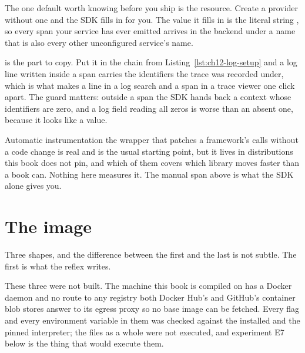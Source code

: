 \noindent
The one default worth knowing before you ship is the resource. Create a
provider without one and the SDK fills in  for you. The
value it fills in is the literal string , so every
span your service has ever emitted arrives in the backend under a name that
is also every other unconfigured service's name.


\noindent
{} is the part to copy. Put it in the chain from
Listing~\ref{lst:ch12-log-setup} and a log line written inside a span
carries the identifiers the trace was recorded under, which is what makes
a line in a log search and a span in a trace viewer one click apart. The
 guard matters: outside a span the SDK hands back a context
whose identifiers are zero, and a log field reading all zeros is worse
than an absent one, because it looks like a value.

\begin{versionbox}
Automatic instrumentation \dash{} the 
wrapper that patches a framework's calls without a code change \dash{} is
real and is the usual starting point, but it lives in distributions this
book does not pin, and which of them covers which library moves faster
than a book can. Nothing here measures it. The manual span above is what
the SDK alone gives you.
\end{versionbox}

\section{The image}
\label{sec:ch12-image}

Three shapes, and the difference between the first and the last is not
subtle. The first is what the reflex writes.




\begin{verifybox}
These three were not built. The machine this book is compiled on has a
Docker daemon and no route to any registry \dash{} both Docker Hub's and
GitHub's container blob stores answer  to its egress proxy
\dash{} so no base image can be fetched. Every flag and every environment
variable in them was checked against the installed  and the
pinned interpreter; the files as a whole were not executed, and experiment
E7 below is the thing that would execute them.
\end{verifybox}

